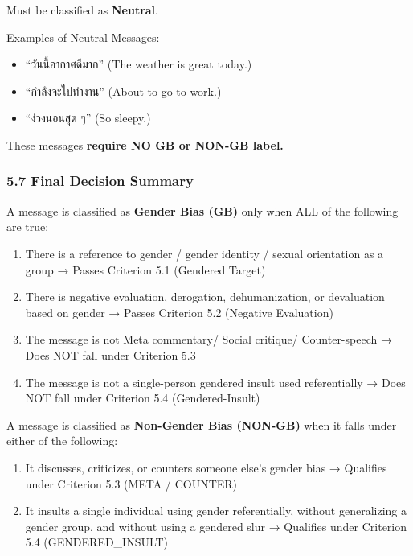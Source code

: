 \documentclass[12pt,oneside,openright,a4paper]{cpe-english-project}
\begin{document}
Must be classified as \textbf{Neutral}.

Examples of Neutral Messages:

\begin{itemize}
\setlength{\itemsep}{0.15\baselineskip}
\setlength{\parsep}{0pt}
\setlength{\parskip}{0pt}
\item
  ``วันนี้อากาศดีมาก'' (The weather is great today.)
\item
  ``กำลังจะไปทำงาน'' (About to go to work.)
\item
  ``ง่วงนอนสุด ๆ'' (So sleepy.)
\end{itemize}

These messages \textbf{require NO GB or NON-GB label.}

\subsubsection{5.7 Final Decision Summary}\label{final-decision-summary}

A message is classified as \textbf{Gender Bias (GB)} only when ALL of
the following are true:

\begin{enumerate}
\setlength{\itemsep}{0.15\baselineskip}
\setlength{\parsep}{0pt}
\setlength{\parskip}{0pt}
\def\labelenumi{\arabic{enumi}.}
\item
  There is a reference to gender / gender identity / sexual orientation
  as a group
  → Passes Criterion 5.1 (Gendered Target)
\item
  There is negative evaluation, derogation, dehumanization, or
  devaluation based on gender → Passes Criterion 5.2 (Negative
  Evaluation)
\item
  The message is not Meta commentary/ Social critique/ Counter-speech
  → Does NOT fall under Criterion 5.3
\item
  The message is not a single-person gendered insult used
  referentially
  → Does NOT fall under Criterion 5.4 (Gendered-Insult)
\end{enumerate}

A message is classified as \textbf{Non-Gender Bias (NON-GB)} when it
falls under either of the following:

\begin{enumerate}
\setlength{\itemsep}{0.15\baselineskip}
\setlength{\parsep}{0pt}
\setlength{\parskip}{0pt}
\def\labelenumi{\arabic{enumi}.}
\item
  It discusses, criticizes, or counters someone else's gender bias
  → Qualifies under Criterion 5.3 (META / COUNTER)
\item
  It insults a single individual using gender referentially, without
  generalizing a gender group, and without using a gendered slur
  → Qualifies under Criterion 5.4 (GENDERED\_INSULT)
\end{enumerate}
\end{document}
